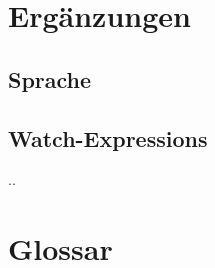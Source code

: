 \documentclass[parskip=full]{scrartcl}
\begin{document}
\section{Ergänzungen}
\subsection{Sprache}

\subsection{Watch-Expressions}
..

\section{Glossar}
\printglossary[style=altlist,title=Glossar]
\end{document}
